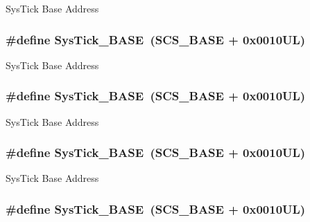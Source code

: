 Sys\-Tick Base Address \hypertarget{group___c_m_s_i_s__core__base_ga58effaac0b93006b756d33209e814646}{
\subsubsection[{Sys\-Tick\-\_\-\-B\-A\-S\-E}]{\setlength{\rightskip}{0pt plus 5cm}\#define Sys\-Tick\-\_\-\-B\-A\-S\-E~({\bf S\-C\-S\-\_\-\-B\-A\-S\-E} +  0x0010\-U\-L)}}\label{group___c_m_s_i_s__core__base_ga58effaac0b93006b756d33209e814646}
Sys\-Tick Base Address \hypertarget{group___c_m_s_i_s__core__base_ga58effaac0b93006b756d33209e814646}{
\subsubsection[{Sys\-Tick\-\_\-\-B\-A\-S\-E}]{\setlength{\rightskip}{0pt plus 5cm}\#define Sys\-Tick\-\_\-\-B\-A\-S\-E~({\bf S\-C\-S\-\_\-\-B\-A\-S\-E} +  0x0010\-U\-L)}}\label{group___c_m_s_i_s__core__base_ga58effaac0b93006b756d33209e814646}
Sys\-Tick Base Address \hypertarget{group___c_m_s_i_s__core__base_ga58effaac0b93006b756d33209e814646}{
\subsubsection[{Sys\-Tick\-\_\-\-B\-A\-S\-E}]{\setlength{\rightskip}{0pt plus 5cm}\#define Sys\-Tick\-\_\-\-B\-A\-S\-E~({\bf S\-C\-S\-\_\-\-B\-A\-S\-E} +  0x0010\-U\-L)}}\label{group___c_m_s_i_s__core__base_ga58effaac0b93006b756d33209e814646}
Sys\-Tick Base Address \hypertarget{group___c_m_s_i_s__core__base_ga58effaac0b93006b756d33209e814646}{
\subsubsection[{Sys\-Tick\-\_\-\-B\-A\-S\-E}]{\setlength{\rightskip}{0pt plus 5cm}\#define Sys\-Tick\-\_\-\-B\-A\-S\-E~({\bf S\-C\-S\-\_\-\-B\-A\-S\-E} +  0x0010\-U\-L)}}\label{group___c_m_s_i_s__core__base_ga58effaac0b93006b756d33209e814646}
